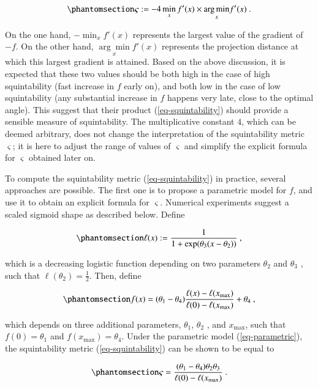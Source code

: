 \documentclass[
  number,
  preprint,
  3p]{elsarticle}
\begin{document}
\begin{equation}\phantomsection\label{eq-squintability}{
\varsigma:=-4\min_{x}f'(x)\times\underset{x}{\arg\min}f'(x)\ .
}\end{equation}

On the one hand, \(-\min_{x}f'(x)\) represents the largest value of the
gradient of \(-f\). On the other hand, \(\underset{x}{\arg\min}f'(x)\)
represents the projection distance at which this largest gradient is
attained. Based on the above discussion, it is expected that these two
values should be both high in the case of high squintability (fast
increase in \(f\) early on), and both low in the case of low
squintability (any substantial increase in \(f\) happens very late,
close to the optimal angle). This suggest that their product
(\ref{eq-squintability}) should provide a sensible measure of
squintability. The multiplicative constant \(4\), which can be deemed
arbitrary, does not change the interpretation of the squintability
metric \(\varsigma\); it is here to adjust the range of values of
\(\varsigma\) and simplify the explicit formula for \(\varsigma\)
obtained later on.

To compute the squintability metric (\ref{eq-squintability}) in
practice, several approaches are possible. The first one is to propose a
parametric model for \(f\), and use it to obtain an explicit formula for
\(\varsigma\). Numerical experiments suggest a scaled sigmoid shape as
described below. Define

\begin{equation}\phantomsection\label{eq-logistic}{
\ell(x):=\frac{1}{1+\exp(\theta_{3}(x-\theta_{2}))}\ ,
}\end{equation}

which is a decreasing logistic function depending on two parameters
\(\theta_2\) and \(\theta_3\) , such that
\(\ell(\theta_{2})=\frac{1}{2}\). Then, define

\begin{equation}\phantomsection\label{eq-parametric}{
f(x)=(\theta_{1}-\theta_{4})\frac{\ell(x)-\ell(x_{\max})}{\ell(0)-\ell(x_{\max})}+\theta_{4}\ ,
}\end{equation}

which depends on three additional parameters, \(\theta_1\), \(\theta_2\)
, and \(x_{\max}\), such that \(f(0)=\theta_1\) and
\(f(x_{\max})=\theta_4\). Under the parametric model
(\ref{eq-parametric}), the squintability metric (\ref{eq-squintability})
can be shown to be equal to

\begin{equation}\phantomsection\label{eq-squintability-parametric}{
\varsigma=\frac{(\theta_{1}-\theta_{4})\theta_{2}\theta_{3}}{\ell(0)-\ell(x_{\max})}\ .
}\end{equation}
\end{document}
